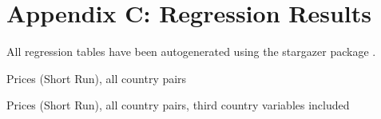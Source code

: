 
\section{Appendix C: Regression Results}
All regression tables have been autogenerated using the stargazer package \citep{Hlavac2014}.

\begin{table}
\tiny
\begin{center}\caption{Prices (Short Run), all country pairs\label{tb:prices_sr}}

\end{center}
\end{table}

\begin{table}
\tiny
\begin{center}\caption{Prices (Short Run), all country pairs, third country 
variables included\label{tb:prices_sr_third}}

\end{center}
\end{table}

